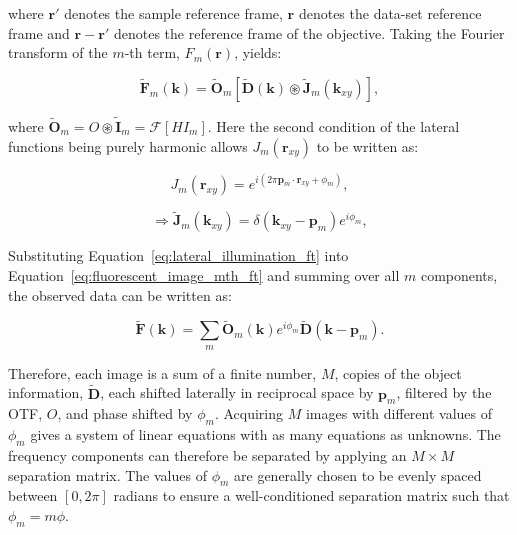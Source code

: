 where $\textbf{r}'$ denotes the sample reference frame, $\textbf{r}$ denotes
the data-set reference frame and $\textbf{r} - \textbf{r}'$ denotes the 
reference frame of the objective. Taking the Fourier transform of the 
$m$-th term, $F_{m}(\textbf{r})$, yields:

\begin{equation}\label{eq:fluorescent_image_mth_ft}
\tilde{\textbf{F}}_{m}(\textbf{k}) = \tilde{\textbf{O}}_{m}\left[\tilde{\textbf{D}}(\textbf{k}) \circledast \tilde{\textbf{J}}_{m}(\textbf{k}_{xy})\right],
\end{equation}

where $\tilde{\textbf{O}}_{m} = O \circledast \tilde{\textbf{I}}_{m} = \mathcal{F}[HI_{m}]$.
Here the second condition of the lateral functions being purely harmonic allows
$J_{m}(\textbf{r}_{xy})$ to be written as:

\begin{equation}\label{eq:lateral_illumination}
J_{m}(\textbf{r}_{xy}) = e^{i\left(2\pi\textbf{p}_m\cdot\textbf{r}_{xy} + \phi_{m}\right)},
\end{equation}

\begin{equation}\label{eq:lateral_illumination_ft}
\Rightarrow \tilde{\textbf{J}}_{m}(\textbf{k}_{xy}) = \delta\left(\textbf{k}_{xy} - \textbf{p}_m\right)e^{i\phi_{m}},
\end{equation}

Substituting Equation~\ref{eq:lateral_illumination_ft} into 
Equation~\ref{eq:fluorescent_image_mth_ft} and summing over all $m$ components,
the observed data can be written as:

\begin{equation}\label{eq:single_SIM_image}
\tilde{\textbf{F}}(\textbf{k}) = \sum\limits_{m}{\tilde{\textbf{O}}_{m}(\textbf{k})e^{i\phi_{m}}\tilde{\textbf{D}}\left(\textbf{k} - \textbf{p}_m\right)}.
\end{equation}

Therefore, each image is a sum of a finite number, $M$, copies of the object 
information, $\tilde{\textbf{D}}$, each shifted laterally in reciprocal space by 
$\textbf{p}_{m}$, filtered by the OTF, $O$, and phase shifted by $\phi_{m}$.
Acquiring $M$ images with different values of $\phi_{m}$ gives a system of 
linear equations with as many equations as unknowns. The frequency components
can therefore be separated by applying an $M\times M$ separation matrix. The 
values of $\phi_{m}$ are generally chosen to be evenly spaced between 
$[0,2\pi]$ radians to ensure a well-conditioned separation 
matrix such that $\phi_{m} = m\phi$\cite{gustafsson2008three}.

